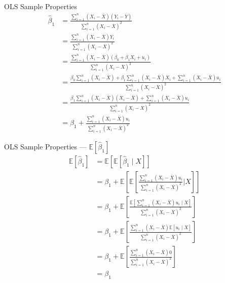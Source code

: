\documentclass[notes,10pt, aspectratio=169]{beamer}
\begin{document}
\begin{frame}{OLS Sample Properties}
\begin{eqnarray*}
&\hat{\beta}_1 &= \frac{\sum_{i=1}^n (X_i - \overline{X})(Y_i - \overline{Y}) }{\sum_{i=1}^n (X_i - \overline{X})^2}\\
& &= \frac{\sum_{i=1}^n (X_i - \overline{X})Y_i }{\sum_{i=1}^n (X_i - \overline{X})^2}\\
& &= \frac{\sum_{i=1}^n (X_i - \overline{X})(\beta_0 + \beta_1 X_i + u_i) }{\sum_{i=1}^n (X_i - \overline{X})^2}\\
& &= \frac{\beta_0\sum_{i=1}^n (X_i - \overline{X})+\beta_1 \sum_{i=1}^n (X_i - \overline{X}) X_i+\sum_{i=1}^n (X_i - \overline{X})u_i}{\sum_{i=1}^n (X_i - \overline{X})^2}\\
& &= \frac{\beta_1 \sum_{i=1}^n (X_i - \overline{X})(X_i - \overline{X})+\sum_{i=1}^n (X_i - \overline{X})u_i}{\sum_{i=1}^n (X_i - \overline{X})^2}\\
& &=\beta_1 +\frac{\sum_{i=1}^n (X_i - \overline{X})u_i}{\sum_{i=1}^n (X_i - \overline{X})^2}
\end{eqnarray*}

\end{frame}


\begin{frame}{OLS Sample Properties --- $\mathbb{E}[\hat{\beta}_1]$}
\begin{eqnarray*}
&\mathbb{E}[\hat{\beta}_1] &=\mathbb{E}[\mathbb{E}[\hat{\beta}_1\mid X]] \\
& &=\beta_1  + \mathbb{E}\left[\mathbb{E}\left[\frac{\sum_{i=1}^n (X_i - \overline{X})u_i}{\sum_{i=1}^n (X_i - \overline{X})^2}\Big| X\right]\right] \\
& &=\beta_1  + \mathbb{E}\left[\frac{\mathbb{E}[\sum_{i=1}^n (X_i - \overline{X})u_i\mid X]}{\sum_{i=1}^n (X_i - \overline{X})^2}\right] \\
& &=\beta_1  + \mathbb{E}\left[\frac{\sum_{i=1}^n (X_i - \overline{X})\mathbb{E}[u_i\mid X]}{\sum_{i=1}^n (X_i - \overline{X})^2}\right] \\
& &=\beta_1  + \mathbb{E}\left[\frac{\sum_{i=1}^n (X_i - \overline{X})0}{\sum_{i=1}^n (X_i - \overline{X})^2}\right] \\
& &=\beta_1
\end{eqnarray*}
\end{frame}
\end{document}
